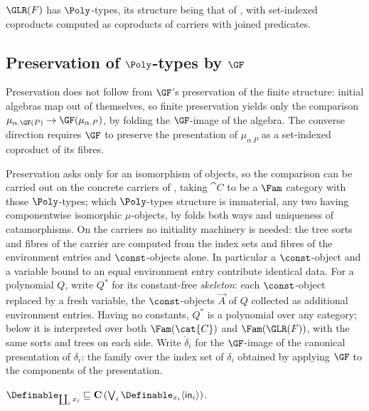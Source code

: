 \begin{corollary}
\label{cor:conservativity:glr-poly}
$\GLR(F)$ has $\Poly$-types, its structure being that of
, with set-indexed coproducts computed as coproducts of carriers
with joined predicates.
\end{corollary}

\subsection{Preservation of $\Poly$-types by $\GF$}
\label{sec:conservativity:gf-poly-types}

Preservation does not follow from $\GF$'s preservation of the finite structure: initial algebras
map out of themselves, so finite preservation yields only the comparison $\mu_{\alpha.\GF(P)}
\to \GF(\mu_{\alpha.P})$, by folding the $\GF$-image of the algebra. The converse direction
requires $\GF$ to preserve the presentation of $\mu_{\alpha.P}$ as a set-indexed coproduct of its
fibres.

Preservation asks only for an isomorphism of objects, so the comparison can be carried out on the
concrete carriers of , taking $\cat{C}$ to be a $\Fam$
category with those $\Poly$-types; which $\Poly$-types structure is immaterial, any two having
componentwise isomorphic $\mu$-objects, by folds both ways and uniqueness of catamorphisms. On the
carriers no initiality machinery is needed: the tree sorts and fibres of the carrier are computed from the index sets and fibres of the
environment entries and $\const$-objects alone. In particular a $\const$-object and a variable
bound to an equal environment entry contribute identical data. For a polynomial $Q$, write $Q^{*}$
for its constant-free \emph{skeleton}: each $\const$-object replaced by a fresh variable, the
$\const$-objects $\vec{A}$ of $Q$ collected as additional environment entries. Having no constants,
$Q^{*}$ is a polynomial over any category; below it is interpreted over both $\Fam(\cat{C})$ and
$\Fam(\GLR(F))$, with the same sorts and trees on each side. Write
$\check{\delta}_i$ for the $\GF$-image of the canonical presentation of $\delta_i$: the family
over the index set of $\delta_i$ obtained by applying $\GF$ to the components of the
presentation.

\begin{lemma}
\label{lem:conservativity:definable-coproducts}
$\Definable_{\coprod_i x_i} \sqsubseteq \mathbf{C}\,(\bigvee_i \Definable_{x_i}\langle
\mathsf{in}_i \rangle)$.
\end{lemma}

